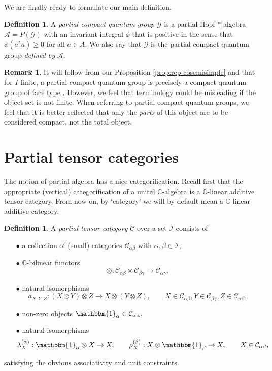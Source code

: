 \documentclass[10pt]{article}
\newcommand{\C}{\mathbb{C}}
\newcommand{\CatC}{\mathcal{C}}
\newcommand{\CatCC}{\mathscr{C}}
\newcommand{\Unitb}{\mathbbm{1}}
\theoremstyle{definition}
\newtheorem{Def}[Theorem]{Definition}
\newtheorem{Rem}[Theorem]{Remark}
\numberwithin{equation}{section}
\begin{document}
We are finally ready to formulate our main definition.
\begin{Def} A \emph{partial compact quantum group} $\mathscr{G}$ is a
  partial Hopf $*$-algebra $\mathscr{A} = P(\mathscr{G})$ with an invariant integral  $\phi$ that is positive in the sense  that $\phi(a^*a)\geq 0$ for all $a\in A$. We also say that $\mathscr{G}$ is the partial compact quantum group \emph{defined by} $\mathscr{A}$.
\end{Def} 

\begin{Rem} It will follow from our Proposition \ref{prop:rep-cosemisimple} and  \cite[Theorem 3.3 and Theorem 4.4]{Hay1} that for $I$ finite, a partial compact quantum group is precisely a compact quantum group of face type \cite[Definition 4.1]{Hay1}. However, we feel that terminology could be misleading if the object set is not finite. When referring to partial compact quantum groups, we feel that it is better reflected that only the \emph{parts} of this object are to be considered compact, not the total object. 
\end{Rem} 

\section{Partial tensor categories}


The notion of partial algebra has a nice categorification. Recall first that the appropriate (vertical) categorification of a unital $\C$-algebra is a $\C$-linear additive tensor category. From now on, by `category' we will by default mean a $\C$-linear additive category. 

\begin{Def} A \emph{partial tensor category} $\CatCC$ over a set $\mathscr{I}$ consists of 
\begin{itemize}
\item[$\bullet$] a collection of (small) categories $\mathcal{C}_{\alpha\beta}$ with $\alpha,\beta\in \mathscr{I}$, 
\item[$\bullet$] $\C$-bilinear functors \[\otimes: \CatC_{\alpha\beta}\times \CatC_{\beta\gamma}\rightarrow \CatC_{\alpha\gamma},\] 
\item[$\bullet$] natural isomorphisms \[ a_{X,Y,Z}: (X\otimes Y)\otimes Z \rightarrow X\otimes (Y\otimes Z),\qquad X \in \CatC_{\alpha\beta},Y\in \CatC_{\beta\gamma},Z\in \CatC_{\alpha\beta},\] 
\item[$\bullet$] non-zero objects $\Unitb_{\alpha} \in \CatC_{\alpha\alpha}$,
\item[$\bullet$] natural isomorphisms \[\lambda_X^{(\alpha)}:\Unitb_\alpha\otimes X \rightarrow X,\qquad \rho_X^{(\beta)}:X\otimes \Unitb_\beta\rightarrow X, \qquad X\in \CatC_{\alpha\beta},\]
\end{itemize}
satisfying the obvious associativity and unit constraints. 
\end{Def}
\end{document}
